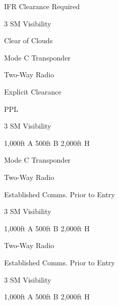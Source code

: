 \documentclass{article}
\begin{document}
\begin{multicols*}{2}


    \begin{notelist}
      \item IFR Clearance Required
    \end{notelist}


    \begin{notelist}
      \item 3 SM Visibility
      \item Clear of Clouds
      \item Mode C Transponder
      \item Two-Way Radio
      \item Explicit Clearance
      \item PPL
    \end{notelist}


    \begin{notelist}
      \item 3 SM Visibility
      \item 1,000ft A 500ft B 2,000ft H
      \item Mode C Transponder
      \item Two-Way Radio
      \item Established Comms. Prior to Entry
    \end{notelist}

    \columnbreak


    \begin{notelist}
      \item 3 SM Visibility
      \item 1,000ft A 500ft B 2,000ft H
      \item Two-Way Radio
      \item Established Comms. Prior to Entry
    \end{notelist}



    \begin{notelist}
      \item 3 SM Visibility
      \item 1,000ft A 500ft B 2,000ft H
    \end{notelist}


\end{multicols*}
\end{document}
